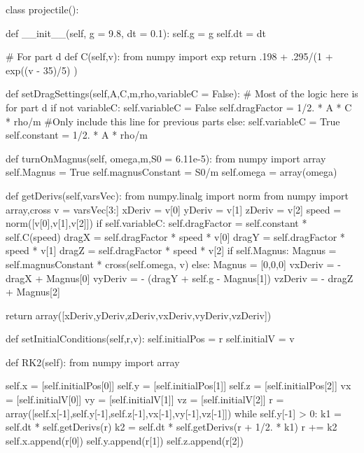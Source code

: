 \begin{enumerate}
\begin{codeexample}
\begin{VerbatimOut}{\listingFile}
class projectile():

    def __init__(self, g = 9.8, dt = 0.1):
        self.g = g
        self.dt = dt

        # For part d
    def C(self,v):
        from numpy import exp
        return .198 + .295/(1 + exp((v - 35)/5) )

    def setDragSettings(self,A,C,m,rho,variableC = False):
        # Most of the logic here is for part d
        if not variableC:
            self.variableC = False
            self.dragFactor = 1/2. * A * C * rho/m  #Only include this line for previous parts
        else:
            self.variableC = True
            self.constant = 1/2. * A * rho/m

    def turnOnMagnus(self, omega,m,S0 = 6.11e-5):
        from numpy import array
        self.Magnus = True
        self.magnusConstant = S0/m
        self.omega = array(omega)
        
    def getDerivs(self,varsVec):
        from numpy.linalg import norm
        from numpy import array,cross
        v = varsVec[3:]
        xDeriv = v[0]
        yDeriv = v[1]
        zDeriv = v[2]
        speed = norm([v[0],v[1],v[2]])
        if self.variableC:
            self.dragFactor = self.constant * self.C(speed)
        dragX = self.dragFactor * speed * v[0]
        dragY = self.dragFactor * speed * v[1]
        dragZ = self.dragFactor * speed * v[2]
        if self.Magnus:
            Magnus = self.magnusConstant * cross(self.omega, v)
        else:
            Magnus = [0,0,0]
        vxDeriv = - dragX + Magnus[0]
        vyDeriv = - (dragY + self.g - Magnus[1])
        vzDeriv = - dragZ + Magnus[2]


        return array([xDeriv,yDeriv,zDeriv,vxDeriv,vyDeriv,vzDeriv])

    def setInitialConditions(self,r,v):
        self.initialPos = r
        self.initialV = v

    def RK2(self):
        from numpy import array

        self.x = [self.initialPos[0]]
        self.y = [self.initialPos[1]]
        self.z = [self.initialPos[2]]
        vx = [self.initialV[0]]
        vy = [self.initialV[1]]
        vz = [self.initialV[2]]
        r = array([self.x[-1],self.y[-1],self.z[-1],vx[-1],vy[-1],vz[-1]])
        while self.y[-1] > 0:
            k1 = self.dt * self.getDerivs(r)
            k2 = self.dt * self.getDerivs(r + 1/2. * k1)
            r += k2
            self.x.append(r[0])
            self.y.append(r[1])
            self.z.append(r[2])



\end{VerbatimOut}
\end{codeexample}
\end{enumerate}
